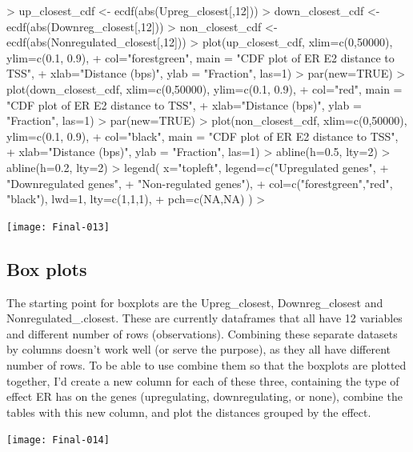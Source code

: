 \documentclass[a4paper,11pt]{article}
\begin{document}
\begin{Schunk}
\begin{Sinput}
> up_closest_cdf <- ecdf(abs(Upreg_closest[,12]))
> down_closest_cdf <- ecdf(abs(Downreg_closest[,12]))
> non_closest_cdf <- ecdf(abs(Nonregulated_closest[,12]))
> plot(up_closest_cdf, xlim=c(0,50000), ylim=c(0.1, 0.9), 
+      col="forestgreen", main = "CDF plot of ER E2 distance to TSS", 
+      xlab="Distance (bps)", ylab = "Fraction", las=1)
> par(new=TRUE)
> plot(down_closest_cdf, xlim=c(0,50000), ylim=c(0.1, 0.9), 
+      col="red", main = "CDF plot of ER E2 distance to TSS", 
+      xlab="Distance (bps)", ylab = "Fraction", las=1)
> par(new=TRUE)
> plot(non_closest_cdf, xlim=c(0,50000), ylim=c(0.1, 0.9), 
+      col="black", main = "CDF plot of ER E2 distance to TSS", 
+      xlab="Distance (bps)", ylab = "Fraction", las=1)                       
> abline(h=0.5, lty=2)
> abline(h=0.2, lty=2)
> legend( x="topleft", legend=c("Upregulated genes",
+                                   "Downregulated genes", 
+                                   "Non-regulated genes"), 
+         col=c("forestgreen","red", "black"), lwd=1, lty=c(1,1,1), 
+         pch=c(NA,NA) )
> 
\end{Sinput}
\end{Schunk}
\texttt{[image: Final-013]}

\subsection{Box plots}

The starting point for boxplots are the Upreg\_closest, Downreg\_closest and Nonregulated\_.closest. These are currently dataframes that all have 12 variables and different number of rows (observations). Combining these separate datasets by columns doesn't work well (or serve the purpose), as they all have different number of rows. To be able to use combine them so that the boxplots are plotted together, I'd create a new column for each of these three, containing the type of effect ER has on the genes (upregulating, downregulating, or none), combine the tables with this new column, and plot the distances grouped by the effect.

\begin{Schunk}
\end{Schunk}
\texttt{[image: Final-014]}
\end{document}
